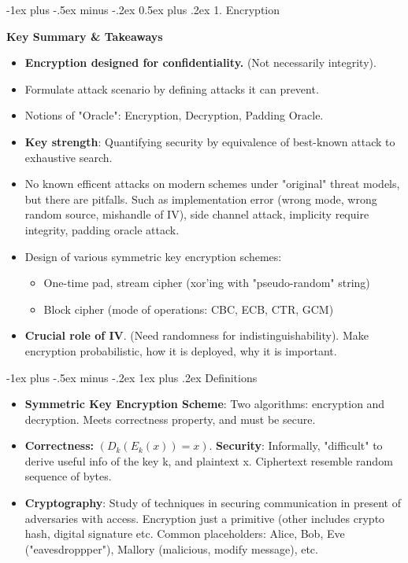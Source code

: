 \documentclass[10pt, landscape]{article}
\makeatletter
\renewcommand{\section}{\@startsection{section}{1}{0mm}%
                                {-1ex plus -.5ex minus -.2ex}%
                                {0.5ex plus .2ex}%
                                {\normalfont\large\bfseries}}
\renewcommand{\subsubsection}{\@startsection{subsubsection}{3}{0mm}%
                                {-1ex plus -.5ex minus -.2ex}%
                                {1ex plus .2ex}%
                                {\normalfont\small\bfseries}}
\makeatother
\begin{document}
\begin{multicols*}{3}
\section{1. Encryption}

\textbf{Key Summary \& Takeaways}
\begin{itemize}
\item \textbf{Encryption designed for confidentiality.} (Not necessarily integrity).
\item Formulate attack scenario by defining attacks it can prevent. 
\item Notions of "Oracle": Encryption, Decryption, Padding Oracle.
\item \textbf{Key strength}: Quantifying security by equivalence of best-known attack to exhaustive search.
\item No known efficent attacks on modern schemes under "original" threat models, but there are pitfalls. Such as implementation error (wrong mode, wrong random source, mishandle of IV), side channel attack, implicity require integrity, padding oracle attack.
\item Design of various symmetric key encryption schemes:
	\begin{itemize}
	\item One-time pad, stream cipher (xor'ing with "pseudo-random" string)
	\item Block cipher (mode of operations: CBC, ECB, CTR, GCM)
	\end{itemize}
\item \textbf{Crucial role of IV}. (Need randomness for indistinguishability). Make encryption probabilistic, how it is deployed, why it is important.
\end{itemize}

\subsubsection{Definitions}
\begin{itemize}
\item \textbf{Symmetric Key Encryption Scheme}: Two algorithms: encryption and decryption. Meets correctness property, and must be secure.
\item \textbf{Correctness:} $(D_k (E_k (x) ) = x )$. \textbf{Security}: Informally, "difficult" to derive useful info of the key k, and plaintext x. Ciphertext resemble random sequence of bytes.
\item \textbf{Cryptography}: Study of techniques in securing communication in present of adversaries with access. Encryption just a primitive (other includes crypto hash, digital signature etc. Common placeholders: Alice, Bob, Eve ("eavesdroppper"), Mallory (malicious, modify message), etc.
\end{itemize}


\end{multicols*}
\end{document}
